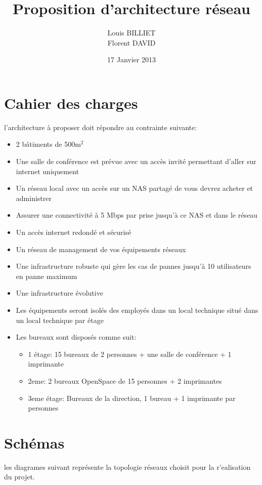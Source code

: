 \documentclass[oneside,10pt]{article}
\begin{document}
\title{Proposition d'architecture r\'eseau}
\author{Louis BILLIET \\ Florent DAVID}
\date{17 Janvier 2013}
\maketitle

\section{Cahier des charges}
l'architecture \`a proposer doit r\'epondre au contrainte suivante:
\begin{itemize}
  \item 2 b\^atiments de 500m$^{2}$
  \item Une salle de conf\'erence est pr\'evue avec un acc\`es invit\'e permettant d'aller sur internet uniquement
  \item Un r\'eseau local avec un acc\`es sur un NAS partag\'e de vous devrez acheter et administrer
  \item Assurer une connectivit\'e \`a 5 Mbps par prise jusqu'\`a ce NAS et dans le r\'eseau
  \item Un acc\`es internet redond\'e et s\'ecuris\'e
  \item Un r\'eseau de management de vos \'equipements r\'eseaux
  \item Une infrastructure robuste qui g\`ere les cas de pannes jusqu'\`a 10 utilisateurs en panne maximum
  \item Une infrastructure \'evolutive
  \item Les \'equipements seront isol\'es des employ\'es dans un local technique situ\'e dans un local technique par \'etage
  \item Les bureaux sont dispos\'es comme suit:
  \begin{itemize}
    \item 1 \'etage: 15 bureaux de 2 personnes + une salle de conf\'erence + 1 imprimante
    \item 2eme: 2 bureaux OpenSpace de 15 personnes + 2 imprimantes
    \item 3eme \'etage: Bureaux de la direction, 1 bureau + 1 imprimante par personnes 
  \end{itemize}
\end{itemize}

\section{Sch\'emas}
les diagrames suivant repr\'esente la topologie r\'eseaux choisit pour la r'ealisation du projet.\\
\end{document}
